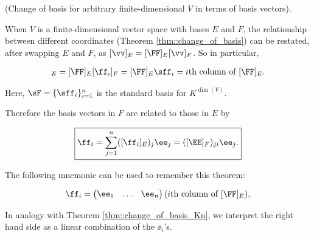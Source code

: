 \begin{theorem}
    (Change of basis for arbitrary finite-dimensional $V$ in terms of basis vectors). 
    
    When $V$ is a finite-dimensional vector space with bases $E$ and $F$, the relationship between different coordinates (Theorem \ref{thm::change_of_basis}) can be restated, after swapping $E$ and $F$, as $[\vv]_E = [\FF]_E [\vv]_F$. So in particular,
    
    \begin{align*}
        [\ff_i]_E = [\FF]_E [\ff_i]_F = [\FF]_E \sff_i = \text{$i$th column of } [\FF]_E.
    \end{align*}
    
    Here, $\sF = \{\sff_i\}_{i = 1}^n$ is the standard basis for $K^{\dim(V)}$.
    
    Therefore the basis vectors in $F$ are related to those in $E$ by
    
    \begin{align*}
        \boxed
        {
            \ff_i = \sum_{j = 1}^n ([\ff_i]_E)_j \ee_j = ([\EE]_F)_{ji} \ee_j.
        }
    \end{align*}
    
    The following mnemonic can be used to remember this theorem:
    
    \begin{align*}
        \ff_i = \begin{pmatrix} \ee_1 & \hdots & \ee_n \end{pmatrix} (\text{$i$th column of } [\FF]_E),
    \end{align*}
    
    In analogy with Theorem \ref{thm::change_of_basis_Kn}, we interpret the right hand side as a linear combination of the $\ee_i$'s. 
\end{theorem}




